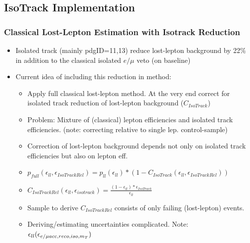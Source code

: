 \documentclass{beamer}
\begin{document}
\subsection{IsoTrack Implementation}
\begin{frame}
 \frametitle{Classical Lost-Lepton Estimation with Isotrack Reduction}
 \begin{itemize}
  \item Isolated track (mainly pdgID=11,13) reduce lost-lepton background by 22\% in addition to the classical isolated $e/\mu$ veto (on baseline)
  \item Current idea of including this reduction in method:
  \begin{itemize}
   \item Apply full classical lost-lepton method. At the very end correct for isolated track reduction of lost-lepton background ($C_{IsoTrack}$)
   \item Problem: Mixture of (classical) lepton efficiencies and isolated track efficiencies. (note: correcting relative to single lep. control-sample)
   \item Correction of lost-lepton background depends not only on isolated track efficiencies but also on lepton eff.
   \item $p_{full}(\epsilon_{ll},\epsilon_{IsoTrackRel}) = p_{ll}(\epsilon_{ll}) * (1-C_{IsoTrack}(\epsilon_{ll},\epsilon_{IsoTrackRel}))$
   \item $C_{IsoTrackRel}(\epsilon_{ll},\epsilon_{isotrack}) = \frac{(1-\epsilon_{ll}) * \epsilon_{IsoTrack}}{\epsilon_{ll}}$ %
   \item Sample to derive $C_{IsoTrackRel}$ consists of only failing (lost-lepton) events.
   \item Deriving/estimating uncertainties complicated. Note: $\epsilon_{ll}(\epsilon_{e/\mu acc,reco,iso,m_{T}})$
  \end{itemize}

 \end{itemize}

\end{frame}
\end{document}
